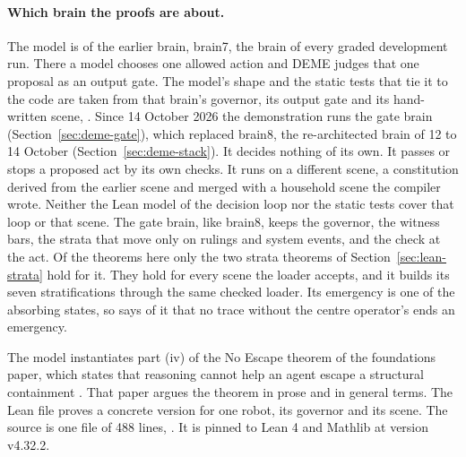 \paragraph{Which brain the proofs are about.}
The model is of the earlier brain, brain7, the brain of every graded development run.
There a model chooses one allowed action and DEME judges that one proposal as an output gate.
The model's shape and the static tests that tie it to the code are taken from that brain's
governor, its output gate and its hand-written scene, .
Since 14 October 2026 the demonstration runs the gate brain (Section~\ref{sec:deme-gate}), which
replaced brain8, the re-architected brain of 12 to 14 October (Section~\ref{sec:deme-stack}).
It decides nothing of its own. It passes or stops a proposed act by its own checks.
It runs on a different scene, a constitution derived from the earlier scene and merged with a
household scene the compiler wrote.
Neither the Lean model of the decision loop nor the static tests cover that loop or that scene.
The gate brain, like brain8, keeps the governor, the witness bars, the strata that move only on
rulings and system events, and the check at the act. Of the theorems here only the two strata
theorems of Section~\ref{sec:lean-strata} hold for it. They hold for every scene the loader accepts,
and it builds its seven stratifications through the same checked loader. Its
emergency is one of the absorbing states, so  says of it that no trace
without the centre operator's  ends an emergency.

The model instantiates part (iv) of the No Escape theorem of the \erisml{} foundations paper,
which states that reasoning cannot help an agent escape a structural containment
\cite{bond2026noescape}.
That paper argues the theorem in prose and in general terms.
The Lean file proves a concrete version for one robot, its governor and its scene.
The source is one file of 488 lines, .
It is pinned to Lean 4 and Mathlib at version v4.32.2.

